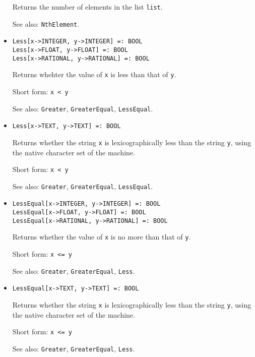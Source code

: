 \begin{itemize}
\bd
Returns the number of elements in the list \verb+list+.
\item
[See also:] {\tt NthElement}.
\ed

\item
\protect \large \begin{verbatim}
Less[x->INTEGER, y->INTEGER] =: BOOL
Less[x->FLOAT, y->FLOAT] =: BOOL
Less[x->RATIONAL, y->RATIONAL] =: BOOL
\end{verbatim}\normalsize

\bd
Returns whehter the value of \verb+x+ is less than that of
\verb+y+.
\item
[Short form:] \verb+x < y+
\item
[See also:] {\tt Greater}, {\tt GreaterEqual}, {\tt LessEqual}.
\ed

\item
\protect \large \begin{verbatim}
Less[x->TEXT, y->TEXT] =: BOOL
\end{verbatim}\normalsize

\bd
Returns whether the string \verb+x+ is lexicographically less than
the string \verb+y+, using the native character set of the machine.
\item
[Short form:] \verb+x < y+
\item
[See also:] {\tt Greater}, {\tt GreaterEqual}, {\tt LessEqual}.
\ed

\item
\protect \large \begin{verbatim}
LessEqual[x->INTEGER, y->INTEGER] =: BOOL
LessEqual[x->FLOAT, y->FLOAT] =: BOOL
LessEqual[x->RATIONAL, y->RATIONAL] =: BOOL
\end{verbatim}\normalsize

\bd
Returns whether the value of \verb+x+ is no more than that
of \verb+y+.
\item
[Short form:] \verb+x <= y+
\item
[See also:] {\tt Greater}, {\tt GreaterEqual}, {\tt Less}.
\ed

\item
\protect \large \begin{verbatim}
LessEqual[x->TEXT, y->TEXT] =: BOOL
\end{verbatim}\normalsize

\bd
Returns whether the string \verb+x+ is lexicographically less than
the string \verb+y+, using the native character set of the machine.
\item
[Short form:] \verb+x <= y+
\item
[See also:] {\tt Greater}, {\tt GreaterEqual}, {\tt Less}.
\ed


\end{itemize}
